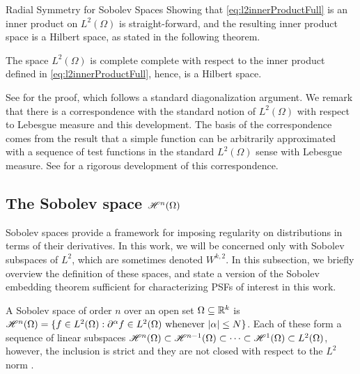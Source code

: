\begin{chapter}{Radial Symmetry for Sobolev Spaces}
Showing that \eqref{eq:l2innerProductFull} is an inner product on $L^2(\Omega)$ is straight-forward, and the resulting inner product space is a Hilbert space, as stated in the following theorem.
\begin{thm}
The space $L^2(\Omega)$ is complete complete with respect to the inner product defined in \eqref{eq:l2innerProductFull}, hence, is a Hilbert space.
\end{thm}
See \citep{richtmyer1978principles} for the proof, which follows a standard diagonalization argument. %
We remark that there is a correspondence with the standard notion of $L^2(\Omega)$ with respect to Lebesgue measure and this development.
The basis of the correspondence comes from the result that a simple function can be arbitrarily approximated with a sequence of test functions in the standard $L^2(\Omega)$ sense with Lebesgue measure. 
See \citep{hormander1983} for a rigorous development of this correspondence.
\subsection{The Sobolev space $\mathscr H^n(\Omega)$}
Sobolev spaces provide a framework for imposing regularity on distributions in terms of their derivatives.
In this work, we will be concerned only with Sobolev subspaces of $L^2$, which are sometimes denoted $W^{k,2}$.
In this subsection, we briefly overview the definition of these spaces, and state a version of the Sobolev embedding theorem sufficient for characterizing PSFs of interest in this work.

A Sobolev space of order $n$ over an open set $\Omega \subseteq \mathbb R^k$ is $\mathscr H^n(\Omega) = \{f \in L^2(\Omega): \partial^\alpha f \in L^2(\Omega)\text{ whenever }|\alpha|\le N\}$.
Each of these form a sequence of linear subspaces $\mathscr H^n(\Omega) \subset \mathscr H^{n-1}(\Omega) \subset \dots \subset \mathscr H^1(\Omega) \subset L^2(\Omega)$, however, the inclusion is strict and they are not closed with respect to the $L^2$ norm \citep{richtmyer1978principles}.


\end{chapter}
